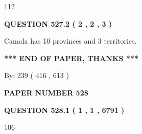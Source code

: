 \documentclass[12pt]{article}
\begin{document}
  
 
 
\noindent{}

112
 
 
  
\vspace{0.2in}
  
{\textbf{\Large{QUESTION
527.2 
 ( 2 , 2 , 3 )
}}}
  
  
 
 
\noindent{}
 
 
Canada has 10  provinces and 3 territories.
 
 
 
 
   
   
 \vspace{0.2in}
 
   
   
   
   
\vspace{1.0in} 
{\textbf{\large{ *** END OF PAPER, THANKS *** }}} 
   
   
\hspace{1.0in} By: 
 239 ( 416 ,  613 )
   
   
   
   
\newpage 
\setcounter{page}{ 
   528001 } 
   
   
   
   
 {\textbf{ \Large{ PAPER NUMBER  528  }}}
   
   
\vspace{0.2in}
   
   
   
   
   
   
 \vspace{0.2in}
 
 
 
 
   
   
  
\vspace{0.2in}
  
{\textbf{\Large{QUESTION
528.1 
 ( 1 , 1 , 6791 )
}}}
  
  
 
 
\noindent{}

106
 
\end{document}
